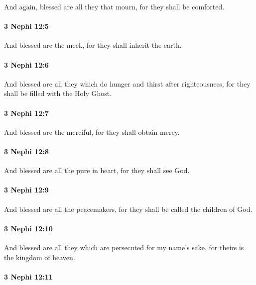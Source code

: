 			And again, blessed are all they that mourn,
			for they shall be comforted.

		\paragraph{3 Nephi 12:5} %
			\label{3NEPHI-12-5}

			And blessed are the meek,
			for they shall inherit the earth.

		\paragraph{3 Nephi 12:6} %
			\label{3NEPHI-12-6}

			And blessed are all they which do hunger and thirst after righteousness,
			for they shall be filled with the Holy Ghost.

		\paragraph{3 Nephi 12:7} %
			\label{3NEPHI-12-7}

			And blessed are the merciful,
			for they shall obtain mercy.

		\paragraph{3 Nephi 12:8} %
			\label{3NEPHI-12-8}

			And blessed are all the pure in heart,
			for they shall see God.

		\paragraph{3 Nephi 12:9} %
			\label{3NEPHI-12-9}

			And blessed are all the peacemakers,
			for they shall be called the children of God.

		\paragraph{3 Nephi 12:10} %
			\label{3NEPHI-12-10}

			And blessed are all they which are persecuted for my name's sake,
			for theirs is the kingdom of heaven.

		\paragraph{3 Nephi 12:11} %
			\label{3NEPHI-12-11}

